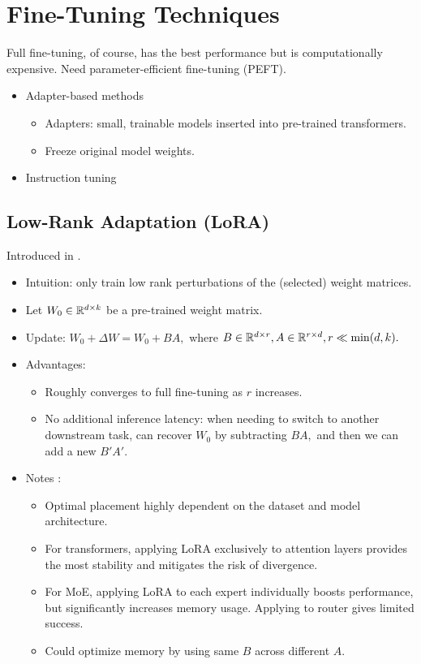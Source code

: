 \chapter{Fine-Tuning Techniques}

Full fine-tuning, of course, has the best performance but is computationally expensive. Need parameter-efficient fine-tuning (PEFT).

\begin{itemize}
    \item Adapter-based methods
    \begin{itemize}
        \item Adapters: small, trainable models inserted into pre-trained transformers.
        \item Freeze original model weights.
    \end{itemize}
    \item Instruction tuning
\end{itemize}

\section{Low-Rank Adaptation (LoRA)}
Introduced in \cite{lora}.
\begin{itemize}
    \item Intuition: only train low rank perturbations of the (selected) weight matrices.
    \item Let $W_0 \in \mathbb{R}^{d \times k}$ be a pre-trained weight matrix.
    \item Update: $W_0 + \Delta W = W_0 + BA,$ where $B \in \mathbb{R}^{d \times r}, A \in \mathbb{R}^{r \times d}, r \ll \min(d,k).$
    \item Advantages:
    \begin{itemize}
        \item Roughly converges to full fine-tuning as $r$ increases.
        \item No additional inference latency: when needing to switch to another downstream task, can recover $W_0$ by subtracting $BA,$ and then we can add a new $B'A'.$
    \end{itemize}
    \item Notes \cite{lora_notes}:
    \begin{itemize}
        \item Optimal placement highly dependent on the dataset and model architecture.
        \item For transformers, applying LoRA exclusively to attention layers provides the most stability and mitigates the risk of divergence.
        \item For MoE, applying LoRA to each expert individually boosts performance, but significantly increases memory usage. Applying to router gives limited success.
        \item Could optimize memory by using same $B$ across different $A.$
    \end{itemize}
\end{itemize}

